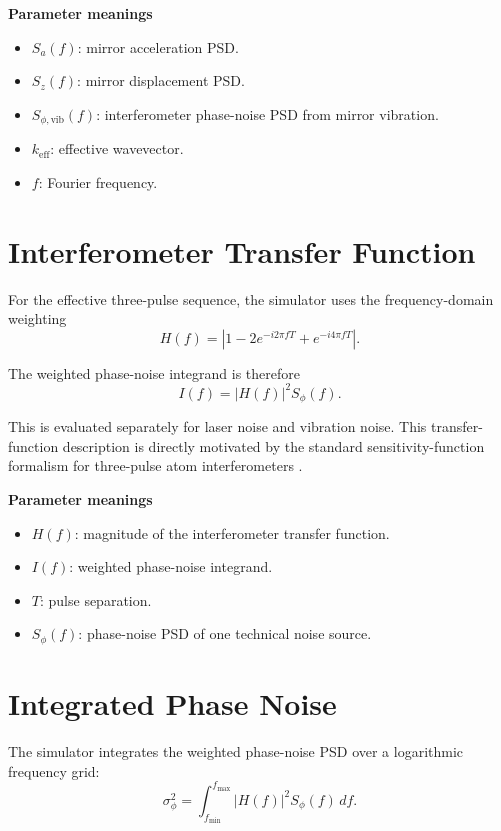 \documentclass[11pt,a4paper]{article}
\begin{document}
\textbf{Parameter meanings}
\begin{itemize}[leftmargin=1.5em]
  \item $S_a(f)$: mirror acceleration PSD.
  \item $S_z(f)$: mirror displacement PSD.
  \item $S_{\phi,\mathrm{vib}}(f)$: interferometer phase-noise PSD from mirror vibration.
  \item $k_{\mathrm{eff}}$: effective wavevector.
  \item $f$: Fourier frequency.
\end{itemize}

\section{Interferometer Transfer Function}

For the effective three-pulse sequence, the simulator uses the frequency-domain weighting
\begin{equation}
  H(f) = \left|1 - 2e^{-i2\pi fT} + e^{-i4\pi fT}\right|.
\end{equation}

The weighted phase-noise integrand is therefore
\begin{equation}
  I(f) = |H(f)|^2 S_{\phi}(f).
\end{equation}

This is evaluated separately for laser noise and vibration noise.
This transfer-function description is directly motivated by the standard sensitivity-function formalism for three-pulse atom interferometers \cite{Cheinet2008}.

\textbf{Parameter meanings}
\begin{itemize}[leftmargin=1.5em]
  \item $H(f)$: magnitude of the interferometer transfer function.
  \item $I(f)$: weighted phase-noise integrand.
  \item $T$: pulse separation.
  \item $S_{\phi}(f)$: phase-noise PSD of one technical noise source.
\end{itemize}

\section{Integrated Phase Noise}

The simulator integrates the weighted phase-noise PSD over a logarithmic frequency grid:
\begin{equation}
  \sigma_{\phi}^2 = \int_{f_{\min}}^{f_{\max}} |H(f)|^2 S_{\phi}(f)\,df.
\end{equation}
\end{document}
